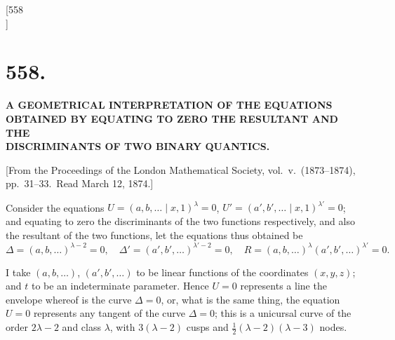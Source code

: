 \documentclass[12pt,a4paper]{article}
\theoremstyle{plain}
\theoremstyle{definition}
\begin{document}

\newpage
\setcounter{page}{16}

\begin{center}
[558\\
]
\end{center}

\section*{\textbf{558.}}

\begin{center}
{\large \textbf{A GEOMETRICAL INTERPRETATION OF THE EQUATIONS}}\\[4pt]
{\large \textbf{OBTAINED BY EQUATING TO ZERO THE RESULTANT AND THE}}\\[4pt]
{\large \textbf{DISCRIMINANTS OF TWO BINARY QUANTICS.}}
\end{center}

\begin{flushright}
{\small [From the Proceedings of the London Mathematical Society, vol.\ v.\ (1873--1874), pp.\ 31--33.\ Read March 12, 1874.]}
\end{flushright}

Consider the equations $U = (a, b, \ldots \mid x, 1)^\lambda = 0$, $U' = (a', b', \ldots \mid x, 1)^{\lambda'} = 0$; and equating to zero the discriminants of the two functions respectively, and also the resultant of the two functions, let the equations thus obtained be
\[
\Delta = (a, b, \ldots)^{\lambda-2} = 0,\quad \Delta' = (a', b', \ldots)^{\lambda'-2} = 0,\quad R = (a, b, \ldots)^\lambda (a', b', \ldots)^{\lambda'} = 0.
\]

I take $(a, b, \ldots)$, $(a', b', \ldots)$ to be linear functions of the coordinates $(x, y, z)$; and $t$ to be an indeterminate parameter. Hence $U = 0$ represents a line the envelope whereof is the curve $\Delta = 0$, or, what is the same thing, the equation $U = 0$ represents any tangent of the curve $\Delta = 0$; this is a unicursal curve of the order $2\lambda - 2$ and class $\lambda$, with $3(\lambda - 2)$ cusps and $\tfrac{1}{2}(\lambda - 2)(\lambda - 3)$ nodes.
\end{document}
